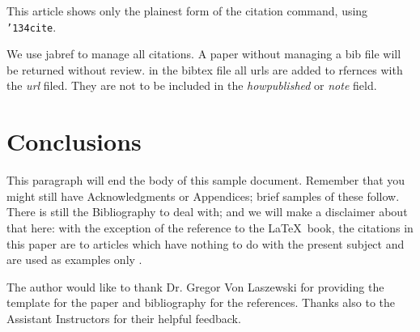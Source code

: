 \documentclass[sigconf]{acmart}
\begin{document}
This article shows only the plainest form of the citation command,
using \texttt{{\char'134}cite}.

We use jabref to manage all citations. A paper without managing a bib
file will be returned without review. in the bibtex file all urls are
added to rfernces with the {\it url} filed. They are not to be
included in the {\it howpublished} or {\it note} field. 



\section{Conclusions}

This paragraph will end the body of this sample document.  Remember
that you might still have Acknowledgments or Appendices; brief samples
of these follow.  There is still the Bibliography to deal with; and we
will make a disclaimer about that here: with the exception of the
reference to the \LaTeX\ book, the citations in this paper are to
articles which have nothing to do with the present subject and are
used as examples only \cite{Paul2014}.


\begin{acks}

  The author would like to thank Dr. Gregor Von Laszewski for providing the 
  \LaTex template for the paper and \JabRef bibliography for the references. 
  Thanks also to the Assistant Instructors for their helpful feedback.

\end{acks}


 
\end{document}
